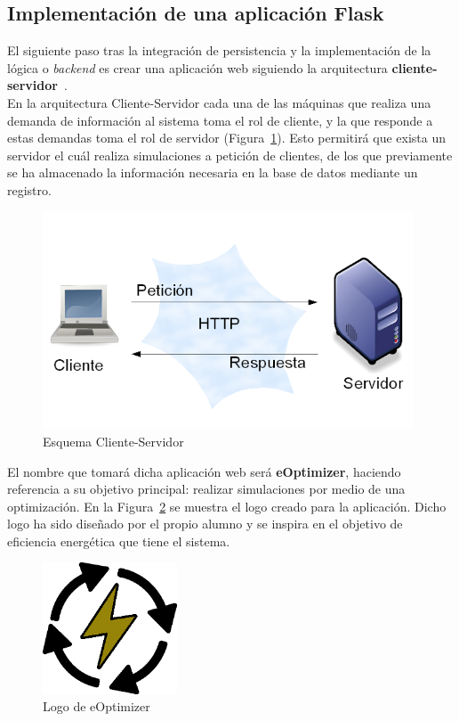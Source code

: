 \subsection{Implementación de una aplicación Flask}
El siguiente paso tras la integración de persistencia y la implementación de la lógica o \textit{backend} es crear una aplicación web siguiendo la arquitectura \textbf{cliente-servidor}~\cite{Goer04}.\\

En la arquitectura Cliente-Servidor cada una de las máquinas que realiza una demanda de información al sistema toma el rol de cliente, y la que responde a estas demandas toma el rol de servidor (Figura~\ref{fig:client-server}). Esto permitirá que exista un servidor el cuál realiza simulaciones a petición de clientes, de los que previamente se ha almacenado la información necesaria en la base de datos mediante un registro.
\begin{figure}[!h]
            \centering
            \includegraphics[width=11cm]{figs/client-server.png}
            \caption{Esquema Cliente-Servidor}
            \label{fig:client-server}
\end{figure}

El nombre que tomará dicha aplicación web será \textbf{eOptimizer}, haciendo referencia a su objetivo principal: realizar simulaciones por medio de una optimización. En la Figura~\ref{fig:logo} se muestra el logo creado para la aplicación. Dicho logo ha sido diseñado por el propio alumno y se inspira en el objetivo de eficiencia energética que tiene el sistema.
\begin{figure}[!h]
            \centering
            \includegraphics[width=4cm]{figs/logo.png}
            \caption{Logo de eOptimizer}
            \label{fig:logo}
\end{figure}

